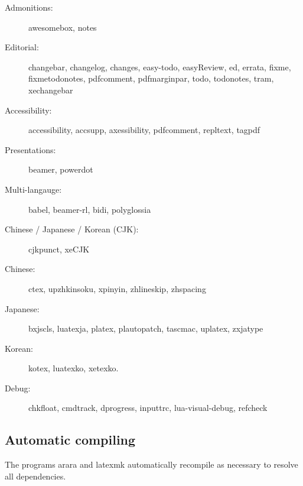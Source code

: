 \documentclass{article}
\def\pkg#1{#1}%
\def\prog#1{\detokenize{#1}}%
\renewcommand*{\pkg}[1]{#1}
\renewcommand*{\prog}[1]{#1}
\begin{document}
\begin{multicols}{2}
\begin{description}
\item[Admonitions:] \pkg{awesomebox}, \pkg{notes}

\item[Editorial:] \pkg{changebar}, \pkg{changelog}, \pkg{changes},
    \pkg{easy-todo}, \pkg{easyReview}, \pkg{ed}, \pkg{errata}, \pkg{fixme},
    \pkg{fixmetodonotes},
    \pkg{pdfcomment}, \pkg{pdfmarginpar},
    \pkg{todo}, \pkg{todonotes}, \pkg{tram}, \pkg{xechangebar}

\item[Accessibility:] \pkg{accessibility}, \pkg{accsupp},
    \pkg{axessibility},
    \pkg{pdfcomment}, \pkg{repltext}, \pkg{tagpdf}

\item[Presentations:] \pkg{beamer}, \pkg{powerdot}

\item[Multi-langauge:] \pkg{babel}, \pkg{beamer-rl}, \pkg{bidi},
    \pkg{polyglossia}

\item[Chinese / Japanese / Korean (CJK):] \pkg{cjkpunct}, \pkg{xeCJK}

\item[Chinese:]
    \label{pkgs:chinese}
    \pkg{ctex}, \pkg{upzhkinsoku},
      \pkg{xpinyin}, \pkg{zhlineskip}, \pkg{zhspacing}


\item[Japanese:]
    \label{pkgs:japanese}
    \pkg{bxjscls}, \pkg{luatexja}, \pkg{platex},
    \pkg{plautopatch}, \pkg{tascmac}, \pkg{uplatex}, \pkg{zxjatype}


\item[Korean:]
    \label{pkgs:korean}
    \pkg{kotex}, \pkg{luatexko}, \pkg{xetexko}.

\item[Debug:] \pkg{chkfloat}, \pkg{cmdtrack}, \pkg{dprogress}, \pkg{inputtrc},
    \pkg{lua-visual-debug}, \pkg{refcheck}

\end{description}

\end{multicols}

\subsection{Automatic compiling}

The programs \prog{arara} and \prog{latexmk} automatically recompile as necessary to
resolve all dependencies.
\end{document}
